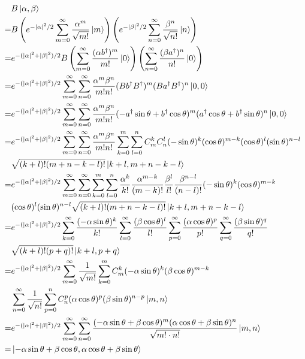 \ex $$\begin{aligned}
    & B\left|\alpha,\beta\right\rangle
    \\ = & B\left(e^{-|\alpha|^2/2}\sum_{m=0}^\infty\frac{\alpha^m}{\sqrt{m!}}\left|m\right\rangle\right)\left(e^{-|\beta|^2/2}\sum_{n=0}^\infty\frac{\beta^n}{\sqrt{n!}}\left|n\right\rangle\right)
    \\ = & e^{-(|\alpha|^2+|\beta|^2)/2}B\left(\sum_{m=0}^\infty\frac{(\alpha b^\dagger)^m}{m!}\left|0\right\rangle\right)\left(\sum_{n=0}^\infty\frac{(\beta a^\dagger)^n}{n!}\left|0\right\rangle\right)
    \\ = & e^{-(|\alpha|^2+|\beta|^2)/2}\sum_{m=0}^\infty\sum_{n=0}^\infty\frac{\alpha^m\beta^n}{m!n!}(Bb^\dagger B^\dagger)^m(Ba^\dagger B^\dagger)^n\left|0,0\right\rangle
    \\ = & e^{-(|\alpha|^2+|\beta|^2)/2}\sum_{m=0}^\infty\sum_{n=0}^\infty\frac{\alpha^m\beta^n}{m!n!}(-a^\dagger\sin\theta+b^\dagger\cos\theta)^m(a^\dagger\cos\theta+b^\dagger\sin\theta)^n\left|0,0\right\rangle
    \\ = & e^{-(|\alpha|^2+|\beta|^2)/2}\sum_{m=0}^\infty\sum_{n=0}^\infty\frac{\alpha^m\beta^n}{m!n!}\sum_{k=0}^m\sum_{l=0}^nC_m^kC_n^l(-\sin\theta)^k(\cos\theta)^{m-k}(\cos\theta)^l(\sin\theta)^{n-l}
    \\ & \sqrt{(k+l)!(m+n-k-l)!}\left|k+l,m+n-k-l\right\rangle
    \\ = & e^{-(|\alpha|^2+|\beta|^2)/2} \sum_{m=0}^\infty\sum_{n=0}^\infty\sum_{k=0}^m\sum_{l=0}^n \frac{\alpha^k}{k!} \frac{\alpha^{m-k}}{(m-k)!} \frac{\beta^l}{l!} \frac{\beta^{n-l}}{(n-l)!} (-\sin\theta)^k(\cos\theta)^{m-k}
    \\ & (\cos\theta)^l(\sin\theta)^{n-l}\sqrt{(k+l)!(m+n-k-l)!}\left|k+l,m+n-k-l\right\rangle
    \\ = & e^{-(|\alpha|^2+|\beta|^2)/2} \sum_{k=0}^\infty\frac{(-\alpha\sin\theta)^k}{k!} \sum_{l=0}^\infty\frac{(\beta\cos\theta)^l}{l!} \sum_{p=0}^\infty\frac{(\alpha\cos\theta)^p}{p!} \sum_{q=0}^\infty\frac{(\beta\sin\theta)^q}{q!}
    \\ & \sqrt{(k+l)!(p+q)!}\left|k+l,p+q\right\rangle
    \\ = & e^{-(|\alpha|^2+|\beta|^2)/2} \sum_{m=0}^\infty\frac{1}{\sqrt{m!}}\sum_{k=0}^mC_m^k(-\alpha\sin\theta)^k(\beta\cos\theta)^{m-k} 
    \\ & \sum_{n=0}^\infty\frac{1}{\sqrt{n!}}\sum_{p=0}^nC_n^p(\alpha\cos\theta)^p(\beta\sin\theta)^{n-p} \left|m,n\right\rangle
    \\ = & e^{-(|\alpha|^2+|\beta|^2)/2} \sum_{m=0}^\infty\sum_{n=0}^\infty \frac{(-\alpha\sin\theta+\beta\cos\theta)^m(\alpha\cos\theta+\beta\sin\theta)^n}{\sqrt{m!\cdot n!}} \left|m,n\right\rangle
    \\ = & \left|-\alpha\sin\theta+\beta\cos\theta,\alpha\cos\theta+\beta\sin\theta\right\rangle
\end{aligned}$$

